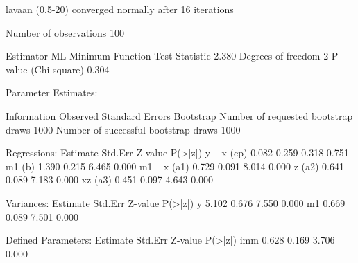 \begin{Schunk}
\begin{Soutput}
lavaan (0.5-20) converged normally after  16 iterations

  Number of observations                           100

  Estimator                                         ML
  Minimum Function Test Statistic                2.380
  Degrees of freedom                                 2
  P-value (Chi-square)                           0.304

Parameter Estimates:

  Information                                 Observed
  Standard Errors                            Bootstrap
  Number of requested bootstrap draws             1000
  Number of successful bootstrap draws            1000

Regressions:
                   Estimate  Std.Err  Z-value  P(>|z|)
  y ~                                                 
    x         (cp)    0.082    0.259    0.318    0.751
    m1         (b)    1.390    0.215    6.465    0.000
  m1 ~                                                
    x         (a1)    0.729    0.091    8.014    0.000
    z         (a2)    0.641    0.089    7.183    0.000
    xz        (a3)    0.451    0.097    4.643    0.000

Variances:
                   Estimate  Std.Err  Z-value  P(>|z|)
    y                 5.102    0.676    7.550    0.000
    m1                0.669    0.089    7.501    0.000

Defined Parameters:
                   Estimate  Std.Err  Z-value  P(>|z|)
    imm               0.628    0.169    3.706    0.000
\end{Soutput}
\end{Schunk}
